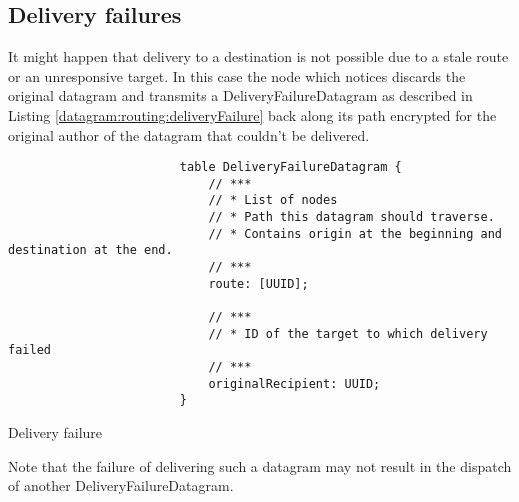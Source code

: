 \documentclass[a4paper]{report}
\begin{document}
            \subsection{Delivery failures}\label{section:datagram:deliveryFailure}
                It might happen that delivery to a destination is not possible due to a stale route or an unresponsive target. In this case the node which notices discards the original \gls{datagram} and transmits a DeliveryFailureDatagram as described in Listing \ref{datagram:routing:deliveryFailure} back along its path encrypted for the original author of the \gls{datagram} that couldn't be delivered.
                \begin{listing}
                    \begin{verbatim}
                        table DeliveryFailureDatagram {
                            // ***
                            // * List of nodes
                            // * Path this datagram should traverse.
                            // * Contains origin at the beginning and destination at the end.
                            // ***
                            route: [UUID];
                        
                            // ***
                            // * ID of the target to which delivery failed
                            // ***
                            originalRecipient: UUID;
                        }
                    \end{verbatim}
                    \caption{Delivery failure}
                    \label{datagram:routing:deliveryFailure}
                \end{listing}
                Note that the failure of delivering such a \gls{datagram} may not result in the dispatch of another DeliveryFailureDatagram.
                
\end{document}
